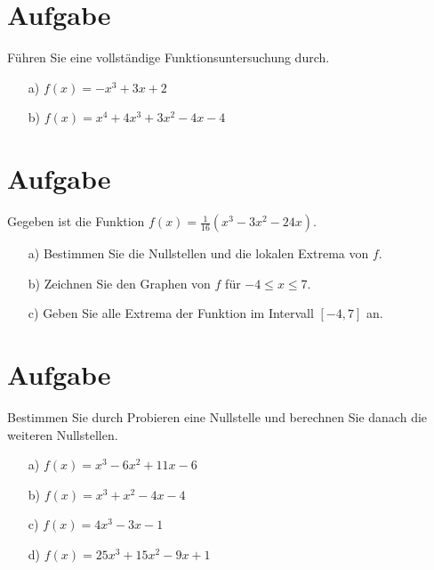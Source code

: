 \section{Aufgabe}

Führen Sie eine vollständige Funktionsuntersuchung durch.

\begin{itemize}
\item[a)]	$f(x) = -x^3+3x+2$ \\
\item[b)]	$f(x) = x^4+4x^3+3x^2-4x-4$
\end{itemize}

\section{Aufgabe}

Gegeben ist die Funktion $f(x)=\frac{1}{16}(x^3-3x^2-24x)$.

\begin{itemize}
\item[a)]	Bestimmen Sie die Nullstellen und die lokalen Extrema von $f$.
\item[b)]	Zeichnen Sie den Graphen von $f$ für $-4\leq x \leq 7$.
\item[c)]	Geben Sie alle Extrema der Funktion im Intervall $[-4,7]$ an.
\end{itemize}

\section{Aufgabe}

Bestimmen Sie durch Probieren eine Nullstelle und berechnen Sie danach die weiteren Nullstellen.

\begin{itemize}
\item[a)]	$f(x)=x^3-6x^2+11x-6$\\
\item[b)]	$f(x)=x^3+x^2-4x-4$\\
\item[c)]	$f(x)=4x^3-3x-1$\\
\item[d)]	$f(x)=25x^3+15x^2-9x+1$
\end{itemize}